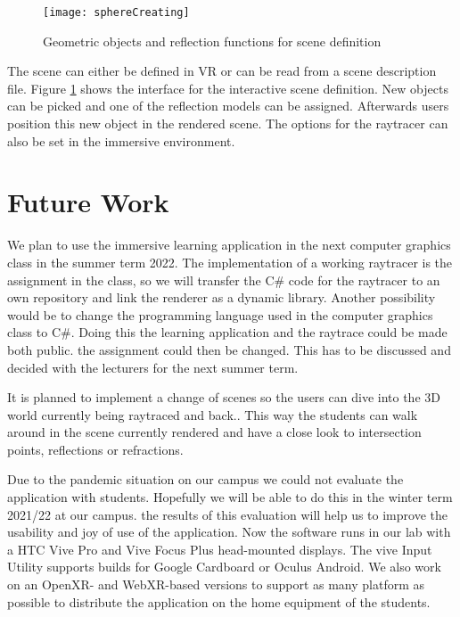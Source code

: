 \documentclass{VRARWorkshop}
\begin{document}
\begin{figure}[h!]
    \begin{center}
        \texttt{[image: sphereCreating]}
        \caption{\label{vray:materials} Geometric objects and reflection functions for scene definition}
    \end{center}
\end{figure}
The scene can either be defined in VR or can be read from a scene description file. 
Figure \ref{vray:materials} shows the interface for the interactive scene definition.
New objects can be picked and one of the reflection models can be assigned.
Afterwards users position this new object in the rendered scene.
The options for the raytracer can also be set in the immersive environment.
%
\section{Future Work}
We plan to use the immersive learning application in the next computer graphics class in the summer term 2022.
The implementation of a working raytracer is the assignment in the class, so we will
transfer the C\# code for the raytracer to an own repository and link the renderer as a dynamic library.
Another possibility would be to change the programming language used in the computer graphics class
to C\#.  Doing this the learning application and the raytrace could be made both public.
the assignment could then be changed.
This has to be discussed and decided with the lecturers for the next summer term.

It is planned
to implement a change of scenes so the users can dive into the 3D world currently being raytraced
and back..
This way the students can walk around in the scene currently rendered and have a close look to intersection points,
reflections or refractions.

Due to the pandemic situation on our campus we could not evaluate the application with students.
Hopefully we will be able to do this in the winter term 2021/22 at our campus. the results of this
evaluation will help us to improve the usability and joy of use of the application.
Now the software runs in our lab with a HTC Vive Pro and Vive Focus Plus head-mounted displays.
The vive Input Utility supports builds for Google Cardboard or Oculus Android. We also work
on an OpenXR- and WebXR-based versions to support as many platform as possible
to distribute the application on the home equipment of the students.

\VRARsetbibstyle

\end{document}
